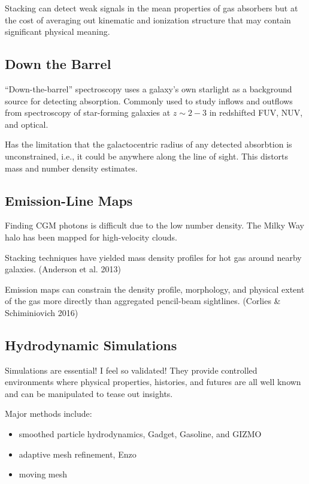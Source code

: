 \documentclass[12pt]{article}
\begin{document}
Stacking can detect weak signals in the mean properties of gas absorbers but at the cost of averaging out
kinematic and ionization structure that may contain significant physical meaning.

\subsection{Down the Barrel}
``Down-the-barrel'' spectroscopy uses a galaxy's own starlight as a background source for detecting absorption.
Commonly used to study inflows and outflows from spectroscopy of star-forming galaxies at $z \sim 2-3$ in
redshifted FUV, NUV, and optical.

Has the limitation that the galactocentric radius of any detected absorbtion is unconstrained, i.e., it could
be anywhere along the line of sight. This distorts mass and number density estimates.

\subsection{Emission-Line Maps}

Finding CGM photons is difficult due to the low number density. The Milky Way halo has been mapped for high-velocity
clouds.

Stacking techniques have yielded mass density profiles for hot gas around nearby galaxies. (Anderson et al. 2013)

Emission maps can constrain the density profile, morphology, and physical extent of the gas more directly than
aggregated pencil-beam sightlines. (Corlies \& Schiminiovich 2016)

\subsection{Hydrodynamic Simulations}

Simulations are essential! I feel so validated!
They provide controlled environments where physical properties, histories, and futures are all well known
and can be manipulated to tease out insights.

Major methods include:
\begin{itemize}
\item{smoothed particle hydrodynamics, Gadget, Gasoline, and GIZMO}
\item{adaptive mesh refinement, Enzo}
    \item{moving mesh}
\end{itemize}
\end{document}
